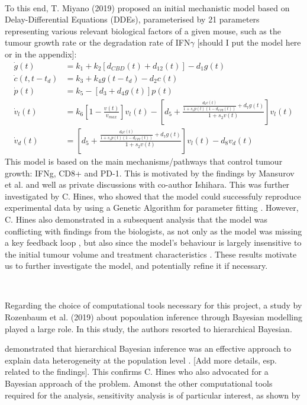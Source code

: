 \documentclass[11pt]{article}
\begin{document}
~ %
\par To this end, T. Miyano (2019) proposed an initial mechanistic model based on Delay-Differential Equations (DDEs), parameterised by 21 parameters representing various relevant biological factors of a given mouse, such as the tumour growth rate or the degradation rate of IFN$\gamma$ \cite{takuya} [should I put the model here or in the appendix]:
\begin{align*}
    \dot{g}(t) &= k_1 + k_2 [d_{CBD}(t) + d_{12}(t)] - d_1g(t) \\ 
    \dot{c}(t,t-t_d) &= k_3 + k_4g(t-t_d)-d_2c(t) \\ 
    \dot{p}(t) &= k_5 - [d_3 + d_4g(t)]p(t) \\ 
    \dot{v}_l(t) &= k_6\left[1 - \frac{v(t)}{v_{max}} \right]v_l(t) - \left[d_5 + \frac{\frac{d_6c(t)}{1+s_1p(t)(1-d_{CPI}(t))}+d_7g(t)}{1+s_2v(t)}\right]v_l(t)\\
    \dot{v}_d(t) &= \left[d_5 + \frac{\frac{d_6c(t)}{1+s_1p(t)(1-d_{CPI}(t))}+d_7g(t)}{1+s_2v(t)}\right]v_l(t) - d_8 v_d(t)
\end{align*}
This model is based on the main mechanisms/pathways that control tumour growth: IFNg, CD8+ and PD-1. This is motivated by the findings by Mansurov et al. \cite{cbdil12} and well as private discussions with co-author Ishihara. This was further investigated by C. Hines, who showed that the model could successfuly reproduce experimental data by using a Genetic Algorithm for parameter fitting \cite{christian1}. However, C. Hines also demonstrated in a subsequent analysis that the model was conflicting with findings from the biologists, as not only as the model was missing a key feedback loop \cite{christian2}, but also since the model's behaviour is largely insensitive to the initial tumour volume and treatment characteristics \cite{christian1}. These results motivate us to further investigate the model, and potentially refine it if necessary. 

~ %
\par Regarding the choice of computational tools necessary for this project, a study by Rozenbaum et al. (2019) about popoulation inference through Bayesian modelling played a large role. In this study, the authors resorted to hierarchical Bayesian. 

demonstrated that hierarchical Bayesian inference was an effective approach to explain data heterogeneity at the population level \cite{rosenbaum}. [Add more details, esp. related to the findings]. This confirms C. Hines \cite{christian2} who also advocated for a Bayesian approach of the problem. Amonst the other computational tools required for the analysis, sensitivity analysis is of particular interest, as shown by \cite[text]{sens_review} 
\end{document}
